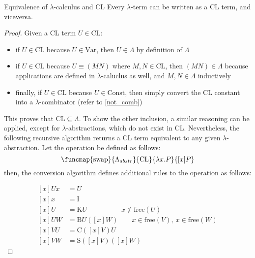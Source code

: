 \documentclass[a4paper, 12pt]{report}
\begin{document}
    \begin{framedthm}{Equivalence of $\lambda$-calculus and CL}
        Every $\lambda$-term can be written as a CL term, and viceversa.
    \end{framedthm}

    \begin{proof}
        Given a CL term $U \in \mathrm{CL}$:

        \begin{itemize}
            \item if $U \in \mathrm{CL}$ because $U \in \mathrm{Var}$, then $U \in \Lambda$ by definition of $\Lambda$
            \item if $U \in \mathrm{CL}$ because $U \equiv (MN)$ where $M, N \in \mathrm{CL}$, then $(MN) \in \Lambda$ because applications are defined in $\lambda$-caluclus as well, and $M, N \in \Lambda$ inductively
            \item finally, if $U \in \mathrm{CL}$ because $U \in \mathrm{Const}$, then simply convert the CL constant into a $\lambda$-combinator (refer to \cref{not_comb})
        \end{itemize}

        This proves that $\mathrm{CL} \subseteq \Lambda$. To show the other inclusion, a similar reasoning can be applied, except for $\lambda$-abstractions, which do not exist in CL. Nevertheless, the following recursive algorithm returns a CL term equivalent to any given $\lambda$-abstraction. Let the  operation be defined as follows: $$\funcmap{\mathrm{swap}}{\Lambda_{abstr}}{\mathrm{CL}}{\lambda x. P}{[x]P}$$ then, the conversion algorithm defines additional rules to the  operation as follows:

        \begin{equation*}
            \begin{split}
                [x]Ux &= U \\
                [x]x &= \mathrm I \\
                [x]U &= \mathrm KU \quad \quad \quad \quad \quad x \notin \mathrm{free}(U) \\
                [x]UW &= \mathrm BU([x]W) \quad \quad x \in \mathrm{free}(V), \ x \in \mathrm{free}(W) \\
                [x]VU &= \mathrm C([x]V)U \\
                [x]VW &= \mathrm S([x]V)([x]W)
            \end{split}
        \end{equation*}
    \end{proof}
\end{document}
